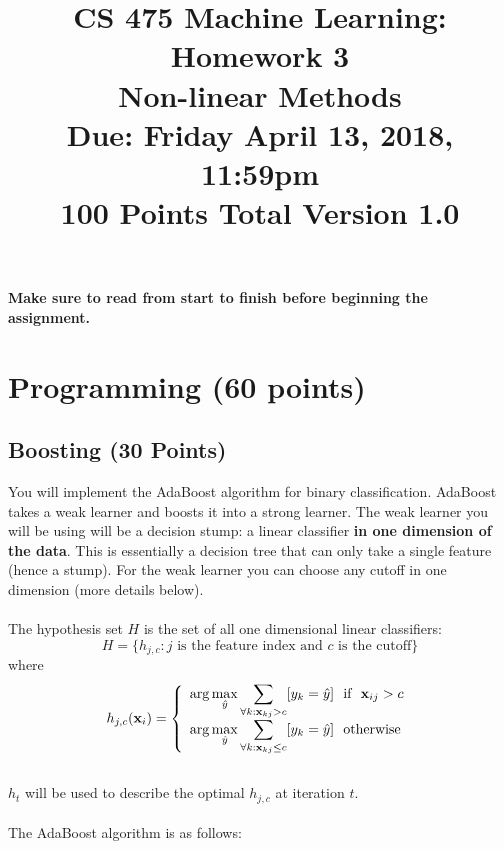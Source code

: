 \documentclass[11pt]{article}
\title{CS 475 Machine Learning: Homework 3\\Non-linear Methods\\
	\Large{Due: Friday April 13, 2018, 11:59pm}\\
	100 Points Total \hspace{1cm} Version 1.0}
\author{}
\date{}
\newcommand{\vx}{{\bf x}}
\newcommand{\vxi}{{\bf x}_i}
\newcommand{\vxij}{{\bf x}_{ij}}
\newcommand{\yh}{\hat{y}}
\begin{document}
	\large
	\maketitle
	\thispagestyle{headings}
	
	\vspace{-.5in}
	
	{\bf Make sure to read from start to finish before beginning the assignment.}
	\section{Programming (60 points)}
	
	\subsection{Boosting (30 Points)}
	You will implement the AdaBoost algorithm for binary classification. AdaBoost takes a weak learner and boosts it into a strong learner. The weak learner you will be using will be a decision stump: a linear classifier \textbf{in one dimension of the data}. This is essentially a decision tree that can only take a single feature (hence a stump). For the weak learner you can choose any cutoff in one dimension (more details below).\\
	\\
	The hypothesis set $H$ is the set of all one dimensional linear classifiers:\\
	\[
	H=\{h_{j,c} : \textrm{$j$ is the feature index and $c$ is the cutoff}\} 
	\]
	where \\
	\[
	h_{j,c}(\vxi) =\left\{
	\begin{array}{lr}
	\displaystyle \arg\max_{\yh} \sum_{\forall k : \vx_{kj} > c} [y_k = \yh] ~~  \textrm{if} ~~ \vxij > c  \\
	\displaystyle \arg\max_{\yh} \sum_{\forall k : \vx_{kj} \le c} [y_k = \yh] ~~ \textrm{otherwise}
	\end{array}
	\right.
	\]
	\\   
	$h_t$ will be used to describe the optimal $h_{j,c}$ at iteration $t$.\\
	\\
	The AdaBoost algorithm is as follows:\\
\end{document}
